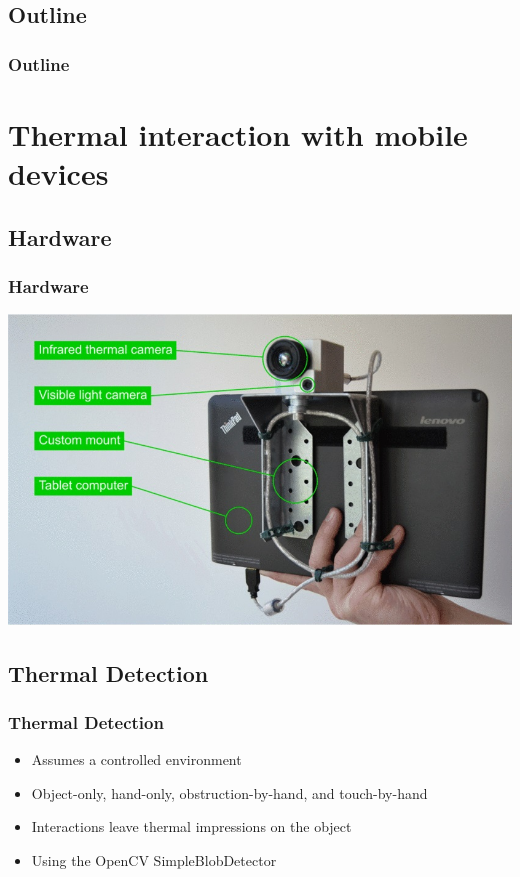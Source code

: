 \documentclass{beamer}
\begin{document}
\subsection*{Outline}
\begin{frame}
  \frametitle{Outline}
  \tableofcontents[hideallsubsections]
\end{frame}

\section[Mobile Thermal Interaction]{Thermal interaction with mobile devices}

\subsection{Hardware}
\begin{frame}
\frametitle{Hardware}	

	\includegraphics[width=\textwidth]{../Sample_paper/images/Hardware2}
	
\end{frame}

\subsection{Thermal Detection}
\begin{frame}
\frametitle{Thermal Detection}
	\begin{itemize}
		\item Assumes a controlled environment
		\item Object-only, hand-only, obstruction-by-hand, and touch-by-hand
		\item Interactions leave thermal impressions on the object
		\item Using the OpenCV SimpleBlobDetector
	\end{itemize}
\end{frame}
\end{document}
